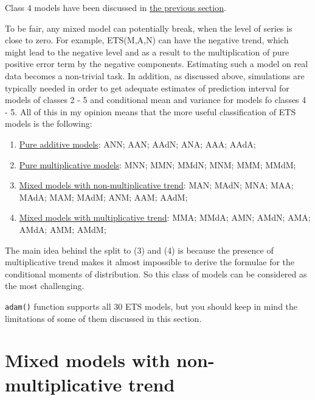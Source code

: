 \documentclass[
]{book}
\providecommand{\tightlist}{%
  \setlength{\itemsep}{0pt}\setlength{\parskip}{0pt}}
\theoremstyle{definition}
\theoremstyle{definition}
\theoremstyle{definition}
\theoremstyle{definition}
\theoremstyle{remark}
\begin{document}
Class 4 models have been discussed in \protect\hyperlink{ADAMETSPureMultiplicative}{the previous section}.

To be fair, any mixed model can potentially break, when the level of series is close to zero. For example, ETS(M,A,N) can have the negative trend, which might lead to the negative level and as a result to the multiplication of pure positive error term by the negative components. Estimating such a model on real data becomes a non-trivial task. In addition, as discussed above, simulations are typically needed in order to get adequate estimates of prediction interval for models of classes 2 - 5 and conditional mean and variance for models fo classes 4 - 5. All of this in my opinion means that the more useful classification of ETS models is the following:

\begin{enumerate}
\def\labelenumi{\arabic{enumi}.}
\tightlist
\item
  \protect\hyperlink{ADAMETSPureAdditive}{Pure additive models}: ANN; AAN; AAdN; ANA; AAA; AAdA;
\item
  \protect\hyperlink{ADAMETSPureMultiplicative}{Pure multiplicative models}: MNN; MMN; MMdN; MNM; MMM; MMdM;
\item
  \protect\hyperlink{ADAMETSMixedModelsGroup3}{Mixed models with non-multiplicative trend}: MAN; MAdN; MNA; MAA; MAdA; MAM; MAdM; ANM; AAM; AAdM;
\item
  \protect\hyperlink{ADAMETSMixedModelsGroup4}{Mixed models with multiplicative trend}: MMA; MMdA; AMN; AMdN; AMA; AMdA; AMM; AMdM;
\end{enumerate}

The main idea behind the split to (3) and (4) is because the presence of multiplicative trend makes it almost impossible to derive the formulae for the conditional moments of distribution. So this class of models can be considered as the most challenging.

\texttt{adam()} function supports all 30 ETS models, but you should keep in mind the limitations of some of them discussed in this section.

\hypertarget{ADAMETSMixedModelsGroup3}{%
\section{Mixed models with non-multiplicative trend}\label{ADAMETSMixedModelsGroup3}}
\end{document}
